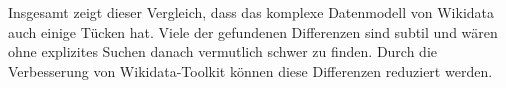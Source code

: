 Insgesamt zeigt dieser Vergleich, dass das komplexe Datenmodell von Wikidata auch einige Tücken hat.
Viele der gefundenen Differenzen sind subtil und wären ohne explizites Suchen danach vermutlich schwer zu finden.
Durch die Verbesserung von Wikidata-Toolkit können diese Differenzen reduziert werden.
% 
% 
% 
% 
% 
% 
